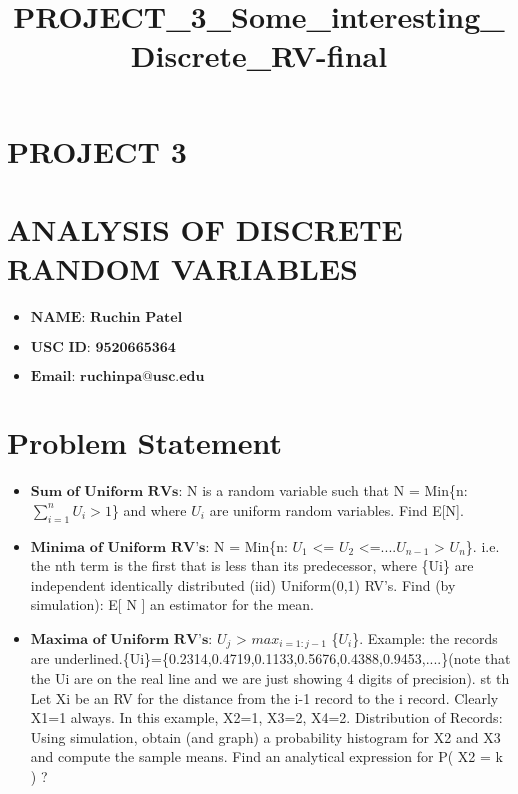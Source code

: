 \documentclass[11pt]{article}
\title{PROJECT\_3\_Some\_interesting\_Discrete\_RV-final}
\providecommand{\tightlist}{%
      \setlength{\itemsep}{0pt}\setlength{\parskip}{0pt}}
\begin{document}
    
    
    \maketitle
    
    

    
    \section{PROJECT 3}\label{project-3}

\section{ANALYSIS OF DISCRETE RANDOM
VARIABLES}\label{analysis-of-discrete-random-variables}

    \begin{itemize}
\tightlist
\item
  \(\textbf{NAME: Ruchin Patel}\)
\item
  \(\textbf{USC ID: 9520665364}\)
\item
  \(\textbf{Email: ruchinpa@usc.edu}\)
\end{itemize}

    \section{Problem Statement}\label{problem-statement}

    \begin{itemize}
\item
  \(\textbf{Sum of Uniform RVs}\): N is a random variable such that N =
  Min\{n: \(\sum_{i=1}^{n} U_i > 1\)\} and where \(U_i\) are uniform
  random variables. Find E{[}N{]}.
\item
  \(\textbf{Minima of Uniform RV's}\): N = Min\{n: \(U_1\) \textless{}=
  \(U_2\) \textless{}=....\(U_{n-1}\) \textgreater{} \(U_n\)\}. i.e. the
  nth term is the first that is less than its predecessor, where \{Ui\}
  are independent identically distributed (iid) Uniform(0,1) RV's. Find
  (by simulation): E{[} N {]} an estimator for the mean.
\item
  \(\textbf{Maxima of Uniform RV's}\): \(U_j\) \textgreater{}
  \(max_{i=1:j-1}\) \{\(U_i\)\}. Example: the records are
  underlined.\{Ui\}=\{0.2314,0.4719,0.1133,0.5676,0.4388,0.9453,....\}(note
  that the Ui are on the real line and we are just showing 4 digits of
  precision). st th Let Xi be an RV for the distance from the i-1 record
  to the i record. Clearly X1=1 always. In this example, X2=1, X3=2,
  X4=2. Distribution of Records: Using simulation, obtain (and graph) a
  probability histogram for X2 and X3 and compute the sample means. Find
  an analytical expression for P( X2 = k ) ?
\end{itemize}
\end{document}
